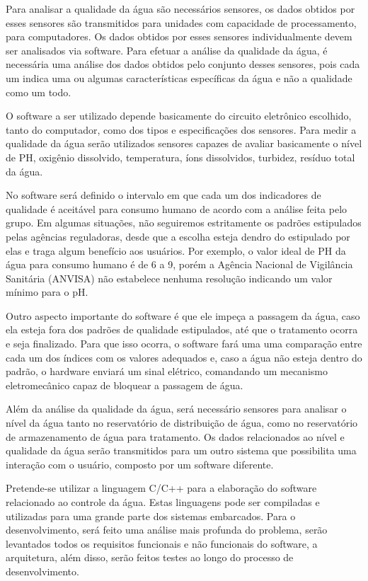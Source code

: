 Para analisar a qualidade da água são necessários sensores, os dados obtidos por esses sensores são transmitidos para
unidades com capacidade de processamento, para computadores. Os dados obtidos por esses sensores individualmente devem
ser analisados via software. Para efetuar a análise da qualidade da água, é necessária uma análise dos dados obtidos
pelo conjunto desses sensores, pois cada um indica uma ou algumas características específicas da água e não a qualidade
como um todo.

O software a ser utilizado depende basicamente do circuito eletrônico escolhido, tanto do computador, como dos tipos
e especificações dos sensores. Para medir a qualidade da água serão utilizados sensores capazes de avaliar basicamente
o nível de PH, oxigênio dissolvido, temperatura, íons dissolvidos, turbidez, resíduo total da água.

No software será definido o intervalo em que cada um dos indicadores de qualidade é aceitável para consumo humano de
acordo com a análise feita pelo grupo.  Em algumas situações, não seguiremos estritamente os padrões estipulados pelas 
agências reguladoras, desde que a escolha esteja dendro do estipulado por elas e traga algum benefício aos usuários. 
Por exemplo, o valor ideal de PH da água para consumo humano é de 6 a 9, porém a Agência Nacional de Vigilância Sanitária (ANVISA)
não estabelece nenhuma resolução indicando um valor mínimo para o pH.

Outro aspecto importante do software é que ele impeça a passagem da água, caso ela esteja fora dos padrões de qualidade
estipulados, até que o tratamento ocorra e seja finalizado. Para que isso ocorra,  o software fará uma uma comparação
entre cada um dos índices com os valores adequados e, caso a água não esteja dentro do padrão, o hardware enviará um 
sinal elétrico, comandando um mecanismo eletromecânico capaz de bloquear a passagem de água.

Além da análise da qualidade da água, será necessário sensores para analisar o nível da água tanto no reservatório
de distribuição de água, como no reservatório de armazenamento de água para tratamento. Os dados relacionados ao nível 
e qualidade da água serão transmitidos para um outro sistema que possibilita uma interação com o usuário, composto por
um software diferente.

Pretende-se utilizar a linguagem C/C++ para a elaboração do software relacionado ao controle da água. Estas linguagens
pode ser compiladas e utilizadas para uma grande parte dos sistemas embarcados. Para o desenvolvimento, será feito uma
análise mais profunda do problema, serão levantados todos os requisitos funcionais e não funcionais do software, a 
arquitetura, além disso, serão feitos testes ao longo do processo de desenvolvimento.

